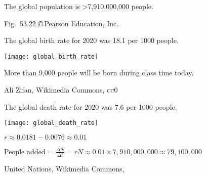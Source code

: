 \documentclass[t]{beamer}
\begin{document}
{
\begin{frame}[b]{The global population is \textgreater7,910,000,000 people.}

	\hfill \tiny Fig.~53.22 \copyright\,Pearson Education, Inc.
\end{frame}
}
%
\begin{frame}[t]{The global birth rate for 2020 was 18.1 per 1000 people.}

	\texttt{[image: global\_birth\_rate]}
	
	\hangpara More than 9,000 people will be born during class time today.
	
	\vfilll
	
	\hfill \tiny Ali Zifan, Wikimedia Commons, \textsc{cc0}
\end{frame}
%
\begin{frame}[t]{The global death rate for 2020 was 7.6 per 1000 people.}

	\texttt{[image: global\_death\_rate]}\par
	
	$r \approx 0.0181 - 0.0076 \approx 0.01$\vspace*{\baselineskip}
	
	People added = $\frac{\Delta N}{\Delta t} =rN \approx 0.01 \times 7,910,000,000 \approx 79,100,000$
		
	\vfilll
	
	\hfill \tiny United Nations, Wikimedia Commons, 
\end{frame}
\end{document}
